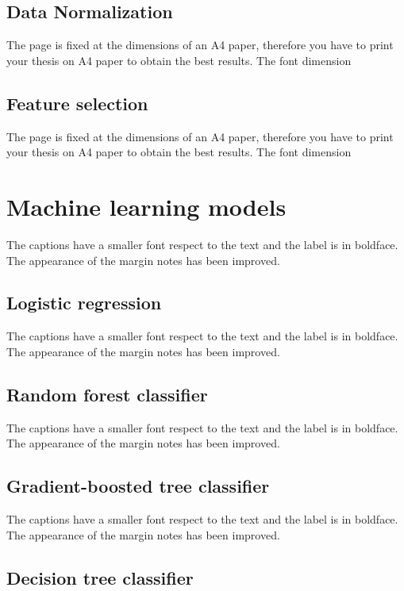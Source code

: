 \documentclass[LaM,binding=0.6cm, english]{sapthesis}
\begin{document}
\subsection{Data Normalization}

The page is fixed at the dimensions of an A4 paper, therefore you have to print your thesis on A4 paper to obtain the best results. The font dimension

\subsection{Feature selection}

The page is fixed at the dimensions of an A4 paper, therefore you have to print your thesis on A4 paper to obtain the best results. The font dimension


\section{Machine learning models}

The captions have a smaller font respect to the text and the label is in boldface. The appearance of the margin notes has been improved.

\subsection{Logistic regression}

The captions have a smaller font respect to the text and the label is in boldface. The appearance of the margin notes has been improved.

\subsection{Random forest classifier}

The captions have a smaller font respect to the text and the label is in boldface. The appearance of the margin notes has been improved.

\subsection{Gradient-boosted tree classifier}

The captions have a smaller font respect to the text and the label is in boldface. The appearance of the margin notes has been improved.

\subsection{Decision tree classifier}
\end{document}
